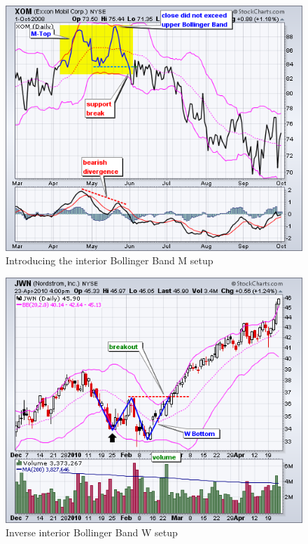 \documentclass{article}
\begin{document}
\vspace{10pt}

\begin{figure}[!htb]
    \centering
    \includegraphics[width=.86\textwidth]{imgs/87.png}
    \caption{Introducing the interior Bollinger Band M setup}
\end{figure}

\vspace{10pt}

\begin{figure}[!htb]
    \centering
    \includegraphics[width=.86\textwidth]{imgs/88.png}
    \caption{Inverse interior Bollinger Band W setup}
\end{figure}

\vspace{10pt}
\end{document}
